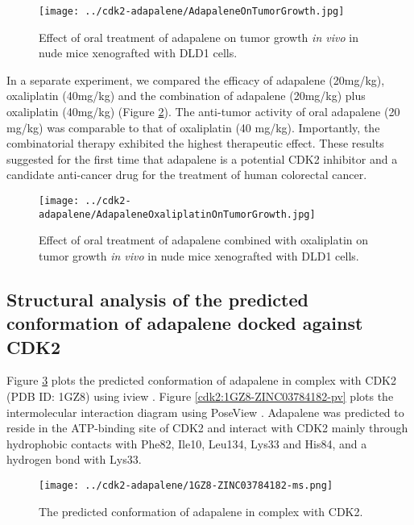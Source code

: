 \begin{figure}
\centering
\texttt{[image: ../cdk2-adapalene/AdapaleneOnTumorGrowth.jpg]}
\caption{Effect of oral treatment of adapalene on tumor growth \textit{in vivo} in nude mice xenografted with DLD1 cells.}
\label{cdk2:AdapaleneOnTumorGrowth}
\end{figure}

In a separate experiment, we compared the efficacy of adapalene (20mg/kg), oxaliplatin (40mg/kg) and the combination of adapalene (20mg/kg) plus oxaliplatin (40mg/kg) (Figure \ref{cdk2:AdapaleneOxaliplatinOnTumorGrowth}). The anti-tumor activity of oral adapalene (20 mg/kg) was comparable to that of oxaliplatin (40 mg/kg). Importantly, the combinatorial therapy exhibited the highest therapeutic effect. These results suggested for the first time that adapalene is a potential CDK2 inhibitor and a candidate anti-cancer drug for the treatment of human colorectal cancer.

\begin{figure}
\centering
\texttt{[image: ../cdk2-adapalene/AdapaleneOxaliplatinOnTumorGrowth.jpg]}
\caption{Effect of oral treatment of adapalene combined with oxaliplatin on tumor growth \textit{in vivo} in nude mice xenografted with DLD1 cells.}
\label{cdk2:AdapaleneOxaliplatinOnTumorGrowth}
\end{figure}

\subsection{Structural analysis of the predicted conformation of adapalene docked against CDK2}

Figure \ref{cdk2:1GZ8-ZINC03784182-ms} plots the predicted conformation of adapalene in complex with CDK2 (PDB ID: 1GZ8) using iview \citep{1366}. Figure \ref{cdk2:1GZ8-ZINC03784182-pv} plots the intermolecular interaction diagram using PoseView \citep{748}. Adapalene was predicted to reside in the ATP-binding site of CDK2 and interact with CDK2 mainly through hydrophobic contacts with Phe82, Ile10, Leu134, Lys33 and His84, and a hydrogen bond with Lys33.

\begin{figure}
\centering
\texttt{[image: ../cdk2-adapalene/1GZ8-ZINC03784182-ms.png]}
\caption{The predicted conformation of adapalene in complex with CDK2.}
\label{cdk2:1GZ8-ZINC03784182-ms}
\end{figure}

